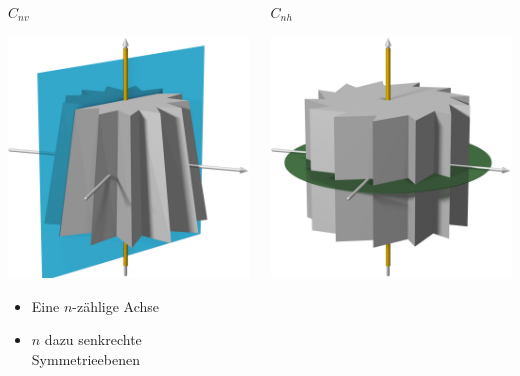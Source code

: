 \begin{frame}[t]
\begin{columns}[t,onlytextwidth]
\begin{column}{0.33\textwidth}
\begin{block}{$C_{nv}$}
\begin{center}
\includegraphics[width=\textwidth]{../slides/6/punktgruppen/images/cnv.jpg}
\end{center}
\begin{itemize}
\item Eine $n$-zählige Achse
\item $n$ dazu senkrechte Symmetrieebenen
\end{itemize}
\end{block}
\end{column}
\begin{column}{0.33\textwidth}
\begin{block}{$C_{nh}$}
\begin{center}
\includegraphics[width=\textwidth]{../slides/6/punktgruppen/images/cnh.jpg}

\end{center}
\end{block}
\end{column}
\end{columns}
\end{frame}
